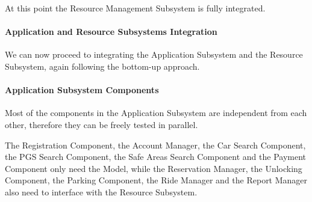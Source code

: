 \documentclass[english]{article}
\begin{document}
At this point the Resource Management Subsystem is fully integrated.
\begin{figure}[H]
	\centering
\end{figure}

\paragraph{Application and Resource Subsystems Integration}
We can now proceed to integrating the Application Subsystem and the Resource Subsystem, again following the bottom-up approach.
\begin{figure}[H]
	\centering
\end{figure}

\paragraph{Application Subsystem Components}
Most of the components in the Application Subsystem are independent from each other, therefore they can be freely tested in parallel.

The Registration Component, the Account Manager, the Car Search Component, the PGS Search Component, the Safe Areas Search Component and the Payment Component only need the Model, while the Reservation Manager, the Unlocking Component, the Parking Component, the Ride Manager and the Report Manager also need to interface with the Resource Subsystem.
\end{document}
